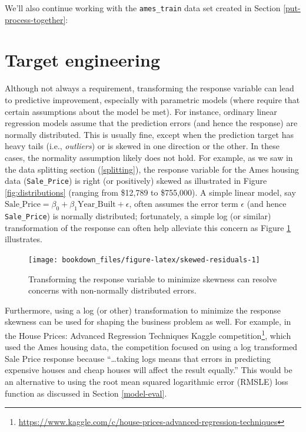 \documentclass[]{krantz}
\begin{document}
We'll also continue working with the \texttt{ames\_train} data set created in Section \ref{put-process-together}:

\hypertarget{target-engineering}{%
\section{Target engineering}\label{target-engineering}}

Although not always a requirement, transforming the response variable can lead to predictive improvement, especially with parametric models (where require that certain assumptions about the model be met). For instance, ordinary linear regression models assume that the prediction errors (and hence the response) are normally distributed. This is usually fine, except when the prediction target has heavy tails (i.e., \emph{outliers}) or is skewed in one direction or the other. In these cases, the normality assumption likely does not hold. For example, as we saw in the data splitting section (\ref{splitting}), the response variable for the Ames housing data (\texttt{Sale\_Price}) is right (or positively) skewed as illustrated in Figure \ref{fig:distributions} (ranging from \$12,789 to \$755,000). A simple linear model, say \(\text{Sale\_Price}=\beta_{0} + \beta_{1} \text{Year\_Built} + \epsilon\), often assumes the error term \(\epsilon\) (and hence \texttt{Sale\_Price}) is normally distributed; fortunately, a simple log (or similar) transformation of the response can often help alleviate this concern as Figure \ref{fig:skewed-residuals} illustrates.

\begin{figure}

{\centering \texttt{[image: bookdown\_files/figure-latex/skewed-residuals-1]} 

}

\caption{Transforming the response variable to minimize skewness can resolve concerns with non-normally distributed errors.}\label{fig:skewed-residuals}
\end{figure}

Furthermore, using a log (or other) transformation to minimize the response skewness can be used for shaping the business problem as well. For example, in the House Prices: Advanced Regression Techniques Kaggle competition\footnote{\url{https://www.kaggle.com/c/house-prices-advanced-regression-techniques}}, which used the Ames housing data, the competition focused on using a log transformed Sale Price response because ``\ldots{}taking logs means that errors in predicting expensive houses and cheap houses will affect the result equally.'' This would be an alternative to using the root mean squared logarithmic error (RMSLE) loss function as discussed in Section \ref{model-eval}.
\end{document}

